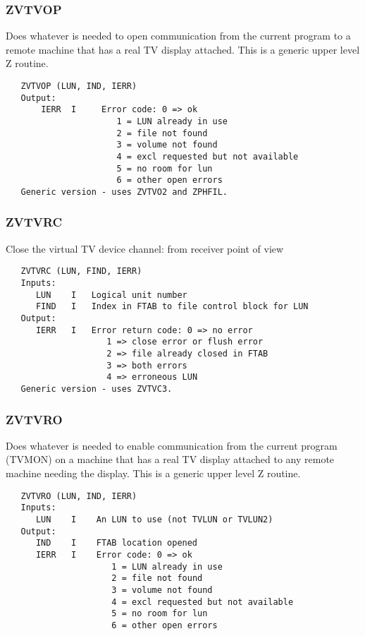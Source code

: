 \subsubsection{ZVTVOP}
Does whatever is needed to open communication from the
current program to a remote machine that has a real TV display
attached.  This is a generic upper level Z routine.
\begin{verbatim}
   ZVTVOP (LUN, IND, IERR)
   Output:
       IERR  I     Error code: 0 => ok
                      1 = LUN already in use
                      2 = file not found
                      3 = volume not found
                      4 = excl requested but not available
                      5 = no room for lun
                      6 = other open errors
   Generic version - uses ZVTVO2 and ZPHFIL.
\end{verbatim}

\subsubsection{ZVTVRC}
Close the virtual TV device channel: from receiver point of view
\begin{verbatim}
   ZVTVRC (LUN, FIND, IERR)
   Inputs:
      LUN    I   Logical unit number
      FIND   I   Index in FTAB to file control block for LUN
   Output:
      IERR   I   Error return code: 0 => no error
                    1 => close error or flush error
                    2 => file already closed in FTAB
                    3 => both errors
                    4 => erroneous LUN
   Generic version - uses ZVTVC3.
\end{verbatim}

\subsubsection{ZVTVRO}
Does whatever is needed to enable communication from the
current program (TVMON) on a machine that has a real TV display
attached to any remote machine needing the display.
This is a generic upper level Z routine.
\begin{verbatim}
   ZVTVRO (LUN, IND, IERR)
   Inputs:
      LUN    I    An LUN to use (not TVLUN or TVLUN2)
   Output:
      IND    I    FTAB location opened
      IERR   I    Error code: 0 => ok
                     1 = LUN already in use
                     2 = file not found
                     3 = volume not found
                     4 = excl requested but not available
                     5 = no room for lun
                     6 = other open errors
\end{verbatim}

